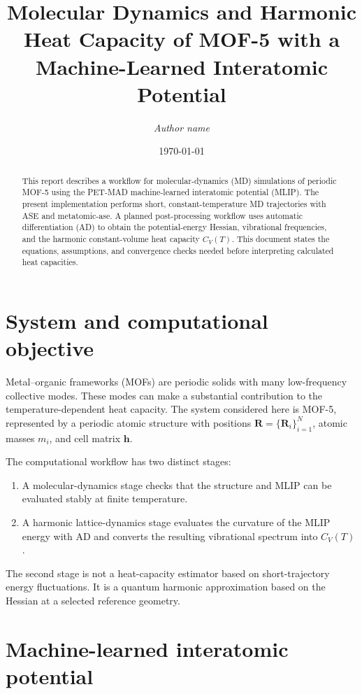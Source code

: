 \documentclass[11pt,a4paper]{article}
\title{Molecular Dynamics and Harmonic Heat Capacity of MOF-5 with a Machine-Learned Interatomic Potential}
\author{\textit{Author name}}
\date{\today}
\begin{document}
\maketitle

\begin{abstract}
This report describes a workflow for molecular-dynamics (MD) simulations of periodic MOF-5 using the PET-MAD machine-learned interatomic potential (MLIP). The present implementation performs short, constant-temperature MD trajectories with ASE and metatomic-ase. A planned post-processing workflow uses automatic differentiation (AD) to obtain the potential-energy Hessian, vibrational frequencies, and the harmonic constant-volume heat capacity $C_V(T)$. This document states the equations, assumptions, and convergence checks needed before interpreting calculated heat capacities.
\end{abstract}

\section{System and computational objective}

Metal--organic frameworks (MOFs) are periodic solids with many low-frequency collective modes. These modes can make a substantial contribution to the temperature-dependent heat capacity. The system considered here is MOF-5, represented by a periodic atomic structure with positions $\bm{R}=\{\bm{R}_i\}_{i=1}^N$, atomic masses $m_i$, and cell matrix $\bm{h}$.

The computational workflow has two distinct stages:

\begin{enumerate}
  \item A molecular-dynamics stage checks that the structure and MLIP can be evaluated stably at finite temperature.
  \item A harmonic lattice-dynamics stage evaluates the curvature of the MLIP energy with AD and converts the resulting vibrational spectrum into $C_V(T)$.
\end{enumerate}

The second stage is not a heat-capacity estimator based on short-trajectory energy fluctuations. It is a quantum harmonic approximation based on the Hessian at a selected reference geometry.

\section{Machine-learned interatomic potential}
\end{document}
